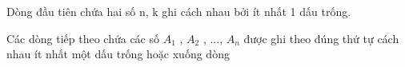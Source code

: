 Dòng đầu tiên chứa hai số n, k ghi cách nhau bởi ít nhất 1 dấu trống.  

   Các dòng tiếp theo chứa các số $A_{1}$   , $A_{2}$   , ..., $A_{n}$   được ghi theo đúng thứ tự cách nhau ít nhất một dấu trống hoặc xuống dòng